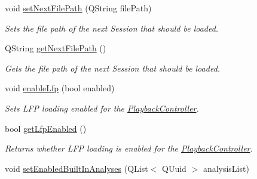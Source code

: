 \begin{DoxyCompactItemize}
\item 
\hypertarget{class_playback_controller_data_a9f3f243a151cd2a730489e7af2f9e3d3}{void \hyperlink{class_playback_controller_data_a9f3f243a151cd2a730489e7af2f9e3d3}{set\-Next\-File\-Path} (Q\-String file\-Path)}\label{class_playback_controller_data_a9f3f243a151cd2a730489e7af2f9e3d3}

\begin{DoxyCompactList}\small\item\em Sets the file path of the next Session that should be loaded. \end{DoxyCompactList}\item 
\hypertarget{class_playback_controller_data_ac12926929b2047f69b899ddee1a1f66c}{Q\-String \hyperlink{class_playback_controller_data_ac12926929b2047f69b899ddee1a1f66c}{get\-Next\-File\-Path} ()}\label{class_playback_controller_data_ac12926929b2047f69b899ddee1a1f66c}

\begin{DoxyCompactList}\small\item\em Gets the file path of the next Session that should be loaded. \end{DoxyCompactList}\item 
\hypertarget{class_playback_controller_data_a5302e9141e5f969191b2cd8b239afdb6}{void \hyperlink{class_playback_controller_data_a5302e9141e5f969191b2cd8b239afdb6}{enable\-Lfp} (bool enabled)}\label{class_playback_controller_data_a5302e9141e5f969191b2cd8b239afdb6}

\begin{DoxyCompactList}\small\item\em Sets L\-F\-P loading enabled for the \hyperlink{class_playback_controller}{Playback\-Controller}. \end{DoxyCompactList}\item 
\hypertarget{class_playback_controller_data_a6856b204f502a8010c581ff0d6d141ea}{bool \hyperlink{class_playback_controller_data_a6856b204f502a8010c581ff0d6d141ea}{get\-Lfp\-Enabled} ()}\label{class_playback_controller_data_a6856b204f502a8010c581ff0d6d141ea}

\begin{DoxyCompactList}\small\item\em Returns whether L\-F\-P loading is enabled for the \hyperlink{class_playback_controller}{Playback\-Controller}. \end{DoxyCompactList}\item 
\hypertarget{class_playback_controller_data_a1f8897c210aa1dd2bfcf5d3f3c5794dc}{void \hyperlink{class_playback_controller_data_a1f8897c210aa1dd2bfcf5d3f3c5794dc}{set\-Enabled\-Built\-In\-Analyses} (Q\-List$<$ Q\-Uuid $>$ analysis\-List)}\label{class_playback_controller_data_a1f8897c210aa1dd2bfcf5d3f3c5794dc}


\end{DoxyCompactItemize}
